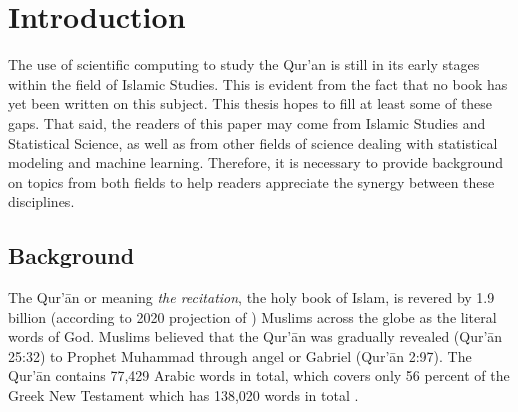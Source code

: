 \chapter{Introduction}
\label{ch:introduction}
The use of scientific computing to study the Qur'an is still in its early stages within the field of Islamic Studies. This is evident from the fact that no book has yet been written on this subject. This thesis hopes to fill at least some of these gaps. That said, the readers of this paper may come from Islamic Studies and Statistical Science, as well as from other fields of science dealing with statistical modeling and machine learning. Therefore, it is necessary to provide background on topics from both fields to help readers appreciate the synergy between these disciplines.

\section{Background}
The Qur'\=an or   meaning \textit{the recitation}, the holy book of Islam, is revered by 1.9 billion (according to 2020 projection of ) Muslims across the globe as the literal words of God. Muslims believed that the Qur'\=an was gradually revealed (Qur'\=an 25:32) to Prophet Muhammad  through angel   or Gabriel (Qur'\=an 2:97). The Qur'\=an contains 77,429 Arabic words in total, which covers only 56 percent of the Greek New Testament which has 138,020 words in total \cite[p.~11]{sinai2017}. 

